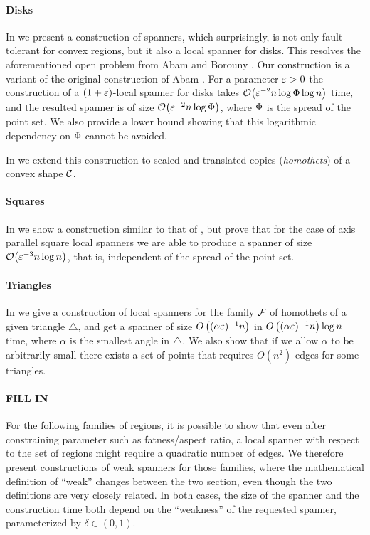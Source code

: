 \documentclass[12pt]{article}%
\begin{document}
\paragraph{Disks}
In  we present a construction of spanners, which
surprisingly, is not only fault-tolerant for convex regions, but it
also a local spanner for disks. This resolves the aforementioned open
problem from Abam and Borouny \cite{ab-lgs-21}. Our construction is a
variant of the original construction of Abam \etal
\cite{abfg-rftgs-09}. For a parameter $\varepsilon>0$ the construction of a
$(1+\varepsilon)$-local spanner for disks takes
$\Of\pth{ \eps^{-2} n\log \spread \log n }$ time, and the resulted
spanner is of size $\Of\pth{ \eps^{-2} n\log \spread }$, where
$\Phi$ is the spread of the point set. We also provide a lower
bound showing that this logarithmic dependency on $\Phi$ cannot be
avoided.

In  we extend this construction to scaled and
translated copies (\emph{homothets}) of a convex shape $\mathcal{C}$.

\paragraph{Squares}
In  we show a construction similar to that of
, but prove that for the case of axis parallel square
local spanners we are able to produce a spanner of size
$\Of\pth{\eps^{-3} n \log n}$, that is, independent of the spread of
the point set.

\paragraph{Triangles}
In  we give a construction of local spanners for the
family $\mathcal{F}$ of homothets of a given triangle $\triangle$, and get a
spanner of size $O\left((\alpha\varepsilon)^{-1}n\right)$ in
$O\left((\alpha\varepsilon)^{-1}n\right)\log n$ time, where $\alpha$ is the
smallest angle in $\triangle$. We also show that if we allow $\alpha$
to be arbitrarily small there exists a set of points that requires
$O(n^2)$ edges for some triangles.

\paragraph{FILL IN}
For the following families of regions, it is possible to show that
even after constraining parameter such as fatness/aspect ratio, a
local spanner with respect to the set of regions might require a
quadratic number of edges. We therefore present constructions of weak
spanners for those families, where the mathematical definition of
``weak'' changes between the two section, even though the two
definitions are very closely related. In both cases, the size of the
spanner and the construction time both depend on the ``weakness'' of
the requested spanner, parameterized by $\delta\in (0,1)$.
\end{document}
